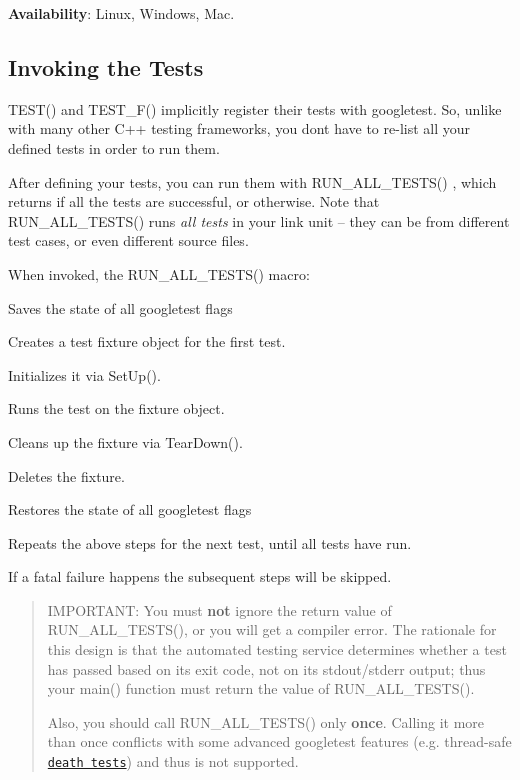 {\bfseries Availability}\+: Linux, Windows, Mac.

\subsection*{Invoking the Tests}

{\ttfamily T\+E\+S\+T()} and {\ttfamily T\+E\+S\+T\+\_\+\+F()} implicitly register their tests with googletest. So, unlike with many other C++ testing frameworks, you don\textquotesingle{}t have to re-\/list all your defined tests in order to run them.

After defining your tests, you can run them with {\ttfamily R\+U\+N\+\_\+\+A\+L\+L\+\_\+\+T\+E\+S\+T\+S()} , which returns {} if all the tests are successful, or {} otherwise. Note that {\ttfamily R\+U\+N\+\_\+\+A\+L\+L\+\_\+\+T\+E\+S\+T\+S()} runs {\itshape all tests} in your link unit -- they can be from different test cases, or even different source files.

When invoked, the {\ttfamily R\+U\+N\+\_\+\+A\+L\+L\+\_\+\+T\+E\+S\+T\+S()} macro\+:


\begin{DoxyEnumerate}
\item Saves the state of all googletest flags
\end{DoxyEnumerate}
\begin{DoxyItemize}
\item Creates a test fixture object for the first test.
\item Initializes it via {\ttfamily Set\+Up()}.
\item Runs the test on the fixture object.
\item Cleans up the fixture via {\ttfamily Tear\+Down()}.
\item Deletes the fixture.
\item Restores the state of all googletest flags
\item Repeats the above steps for the next test, until all tests have run.
\end{DoxyItemize}

If a fatal failure happens the subsequent steps will be skipped.

\begin{quote}
I\+M\+P\+O\+R\+T\+A\+NT\+: You must {\bfseries not} ignore the return value of {\ttfamily R\+U\+N\+\_\+\+A\+L\+L\+\_\+\+T\+E\+S\+T\+S()}, or you will get a compiler error. The rationale for this design is that the automated testing service determines whether a test has passed based on its exit code, not on its stdout/stderr output; thus your {\ttfamily main()} function must return the value of {\ttfamily R\+U\+N\+\_\+\+A\+L\+L\+\_\+\+T\+E\+S\+T\+S()}.

Also, you should call {\ttfamily R\+U\+N\+\_\+\+A\+L\+L\+\_\+\+T\+E\+S\+T\+S()} only {\bfseries once}. Calling it more than once conflicts with some advanced googletest features (e.\+g. thread-\/safe \href{advanced.md#death-tests}{\tt death tests}) and thus is not supported. \end{quote}


